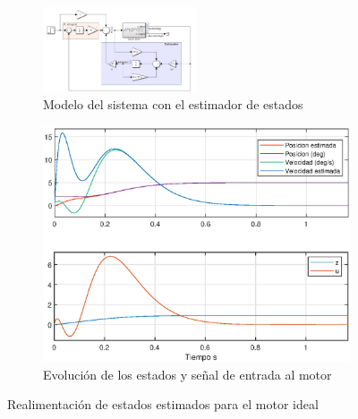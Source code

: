 \documentclass[10pt,a4paper]{report}
\begin{document}
\begin{figure}
\centering
\begin{subfigure}{\textwidth}
\centering
\includegraphics[width=0.5\textwidth]{estimador_integral.jpg}
\caption{Modelo del sistema con el estimador de estados}
\label{f33a}
\end{subfigure}
\begin{subfigure}{\textwidth}
\centering
\includegraphics[scale=0.6]{estimador_integral.eps}
\caption{Evolución de los estados y señal de entrada al motor}
\label{f33b}
\end{subfigure}
\caption{Realimentación de estados estimados para el motor ideal}
\end{figure}
\end{document}
